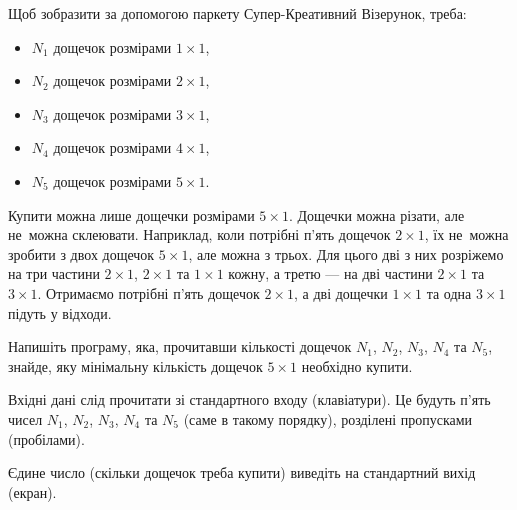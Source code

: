 ﻿Щоб зобразити за допомогою паркету Супер-Креативний Візерунок, треба:
\begin{itemize}
\item
$N_1$ дощечок розмірами $1{\times}1$,
\item
$N_2$ дощечок розмірами $2{\times}1$,
\item
$N_3$ дощечок розмірами $3{\times}1$,
\item
$N_4$ дощечок розмірами $4{\times}1$,
\item
$N_5$ дощечок розмірами $5{\times}1$.
\end{itemize}
Купити можна лише дощечки розмірами $5{\times}1$. Дощечки можна різати, але не~можна склеювати. Наприклад, коли потрібні п’ять дощечок $2{\times}1$, їх не~можна зробити з двох дощечок $5{\times}1$, але можна з трьох. Для цього дві з них розріжемо на три частини $2{\times}1$, $2{\times}1$ та $1{\times}1$ кожну, а третю --- на дві частини $2{\times}1$ та $3{\times}1$. Отримаємо потрібні п’ять дощечок $2{\times}1$, а дві дощечки $1{\times}1$ та одна $3{\times}1$ підуть у відходи.


Напишіть програму, яка, прочитавши кількості дощечок $N_1$, $N_2$, $N_3$, $N_4$ та $N_5$, знайде, яку мінімальну кількість дощечок $5{\times}1$ необхідно купити.

\InputFile	Вхідні дані слід прочитати зі стандартного входу (клавіатури). Це будуть п’ять чисел $N_1$, $N_2$, $N_3$, $N_4$ та $N_5$ (саме в такому порядку), розділені пропусками (пробілами).

\OutputFile	Єдине число (скільки дощечок треба купити) виведіть на стандартний вихід (екран).

\Examples
\begin{example}%
%
%
\end{example}
